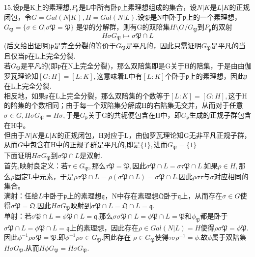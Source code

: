 \documentclass[UTF8]{article}
\begin{document}
 15.设$\mathfrak{p}$是K上的素理想,$P_{\mathfrak{p}}$是L中所有卧$\mathfrak{p}$上素理想组成的集合，设$N|K$是$L|K$的正规闭包，令$G=Gal(N|K),H=Gal(N|L).$设$\mathfrak{P}$是N中卧于$\mathfrak{p}$上的一个素理想，$G_{\mathfrak{P}}=\{\sigma \in G|\sigma \mathfrak{P}=\mathfrak{P}\}$
    是$\mathfrak{P}$的分解群，则有G的双陪集$H\setminus G/G_{\mathfrak{P}}$到$P_{\mathfrak{p}}$的双射$$
    H\sigma G_{\mathfrak{P}}\mapsto \sigma \mathfrak{P}\cap L
    $$
    (后文给出证明)$\mathfrak{p}$是完全分裂的等价于$G_{\mathfrak{P}}$是平凡的，因此只需证明$G_{\mathfrak{P}}$是平凡的当且仅当$\mathfrak{p}$在L上完全分裂.\\
    若$G_{\mathfrak{P}}$是平凡的(即$\mathfrak{p}$在N上完全分裂)，那么双陪集即是G关于H的陪集，于是由由伽罗瓦理论知$[G:H]=[L:K],$这意味着L中有$[L:K]$个卧于$\mathfrak{p}$上的素理想，因此$\mathfrak{p}$在L上完全分裂.\\
    相反地，如果$\mathfrak{p}$在L上完全分裂，那么双陪集的个数等于$[L:K]=[G:H],$这于H的陪集的个数相同；由于每一个双陪集分解成H的右陪集无交并，从而对于任意$\sigma \in G,H\sigma G_{\mathfrak{P}}=H\sigma,$于是$G_{\mathfrak{p}}$关于G的共轭便包含在H中，即$G_{\mathfrak{p}}$生成的正规子群包含在H中。\\
    但由于$N|K$是$L|K$的正规闭包，H对应于L，由伽罗瓦理论知G无非平凡正规子群，从而$G$中包含在H中的正规子群是平凡的,即是$\{1\},$进而$G_{\mathfrak{P}}=\{1\}$\\
    下面证明$H\sigma G_{\mathfrak{P}}$到$\sigma \mathfrak{P}\cap L$是双射.\\
    首先,映射良定义：若$\tau \in G_{\mathfrak{P}},$那么$\tau \mathfrak{P}=\mathfrak{P},$因此$\sigma \mathfrak{P}\cap L=\sigma \tau \mathfrak{P}\cap L.$如果$\rho\in H,$那么$\rho $固定L中元素，于是$\rho \sigma \mathfrak{P}\cap L=\rho(\sigma \mathfrak{P}\cap L)=\sigma \mathfrak{P}\cap L.$因此$\rho\sigma \tau $与$\sigma $对应相同的集合。\\
    满射：任给$L$中卧于$\mathfrak{p}$上的素理想$\mathfrak{q}$，N中存在素理想$\mathfrak{Q}$卧于$\mathfrak{q}$上，从而存在$\sigma \in G$使得$\sigma \mathfrak{P}=\mathfrak{Q}.$因此$H\sigma G_{\mathfrak{P}}$映射到$\sigma \mathfrak{P}\cap L=\mathfrak{Q}\cap L=\mathfrak{q}.$\\
    单射：若$\sigma\mathfrak{P}\cap L = \phi\mathfrak{P}\cap L = \mathfrak{q}.$那么$\sigma \sigma\mathfrak{P}\cap L = \phi\mathfrak{P}\cap L = \mathfrak{P}$和$\phi_{\mathfrak{P}}$都是卧于$\sigma\mathfrak{P}\cap L = \phi\mathfrak{P}\cap L = \mathfrak{q}$上的素理想，因此存在$\rho \in Gal(N|L)=H$使得$\rho\sigma\mathfrak{P} = \phi\mathfrak{P}.$因此$\phi^{-1}\rho\sigma\mathfrak{P} = \mathfrak{P}.$即$\phi^{-1}\rho\sigma\in G_{\mathfrak{P}}.$因此存在
    $\rho \in G_{\mathfrak{P}}$使得$\tau \sigma \rho ^{-1}=\phi.$故$\phi $属于双陪集$H\sigma G_{\mathfrak{P}}.$从而$H\phi G_{\mathfrak{P}}=H\sigma G_{\mathfrak{P}}.$
    
\end{document}
